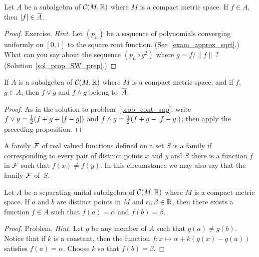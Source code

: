 \begin{prop}\label{prop_SW_prep}  Let $A$ be a subalgebra of $\mathcal{C}(M,\mathbb{R})$ where $M$ is a compact
metric space.  If $f \in A$, then $\lvert f\rvert \in \overline{A}$.
\end{prop}

\begin{proof}  Exercise.  \emph{Hint.}  Let $(p_n)$ be a sequence of polynomials converging uniformly
on $[0,1]$ to the square root function. (See~\ref{exam_approx_sqrt}.)  What can you say about
the sequence $(p_n \circ g^2)$ where $g = f / \|f\|$\,? (Solution~\ref{sol_prop_SW_prep}.) \ns
\end{proof}

\begin{cor}\label{cor_sup_clo}  If $A$ is a subalgebra of $\mathcal{C}(M,\mathbb{R})$ where $M$ is a compact
metric space, and if $f$, $g \in A$, then $f \lor g$ and $f \land g$ belong to~$\overline{A}$.
\end{cor}

\begin{proof}   As in the solution to problem~\ref{prob_cont_sup}, write $f \lor g =
\frac12(f + g + \lvert f-g\rvert)$ and $f \land g = \frac12(f + g - \lvert f-g\rvert)$; then apply the
preceding proposition.
\end{proof}

\begin{defn}  A family $\mathcal{F}$ of real valued functions defined on a set $S$ is a
 family if corresponding to every pair of distinct points $x$ and $y$ and $S$
there is a function $f$ in $\mathcal{F}$ such that $f(x) \ne f(y)$. In this circumstance we may
also say that the family $\mathcal{F}$  of~$S$.
\end{defn}


\begin{prop}\label{prop_sep_subalg}  Let $A$ be a separating unital subalgebra of
$\mathcal{C}(M,\mathbb{R})$ where $M$ is a compact metric space. If $a$ and $b$ are distinct points in
$M$ and $\alpha,\beta \in \mathbb{R}$, then there exists a function $f \in A$ such that $f(a) =
\alpha$ and $f(b) = \beta$.
\end{prop}

\begin{proof} Problem.  \emph{Hint.}  Let $g$ be any member of $A$ such that $g(a) \ne g(b)$.
Notice that if $k$ is a constant, then the function $f \colon x \mapsto \alpha + k(g(x)-g(a))$
satisfies $f(a) = \alpha$. Choose $k$ so that $f(b) = \beta$.   \ns
\end{proof}


